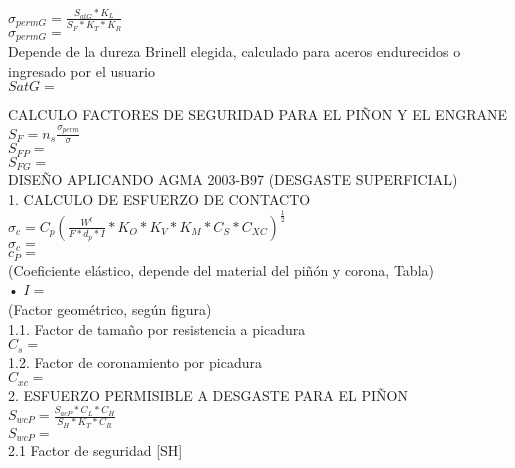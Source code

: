 \documentclass[a4paper,9pt,vertical]{article}
\begin{document}
\begin{multicols}{2}
     $\sigma_{permG} = \frac{S_{atG}*K_L}{S_F*K_T*K_R} $\\
      $\sigma_{permG} =  $\\
    
    Depende de la dureza Brinell elegida, calculado para aceros endurecidos o ingresado por el usuario\\
    
    $SatG =  $
    
    CALCULO FACTORES DE SEGURIDAD PARA EL PIÑON Y EL ENGRANE\\
    
    $S_F = n_s \frac{\sigma_{perm}}{\sigma}$\\
    $S_{FP} =  $\\
    $S_{FG} =  $\\
    DISEÑO APLICANDO AGMA 2003-B97 (DESGASTE SUPERFICIAL)\\
    
    1.	CALCULO DE ESFUERZO DE CONTACTO \\
   
   $\sigma_c = C_p(\frac{W^t}{F*d_p*I}*K_O*K_V*K_M*C_S*C_{XC})^{\frac{1}{2}}$\\
   $\sigma_c =  $ \\
   $c_P =  $\\
    (Coeficiente elástico, depende del material del piñón y corona, Tabla)\\
    
    •	$I =  $\\
    (Factor geométrico, según figura)\\
     
    1.1.	 Factor de tamaño por resistencia a picadura\\
    
   $C_s =  $\\
    
    1.2.	 Factor de coronamiento por picadura\\
    
    $C_{xc} =   $\\
        
    2.    	ESFUERZO PERMISIBLE A DESGASTE PARA EL PIÑON\\
    
    $S_{wcP}=\frac{S_{acP}*C_L*C_H}{S_H*K_T*C_R}$\\
    
    $S_{wcP} =  $\\
    
    2.1	 Factor de seguridad [SH]\\
    

\end{multicols}
\end{document}
